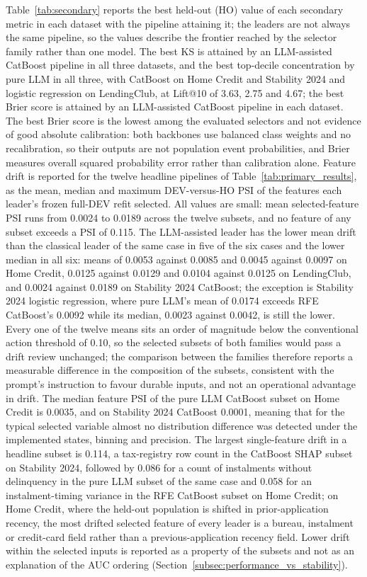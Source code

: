 \documentclass[final,5p,twocolumn]{elsarticle}
\begin{document}
Table~\ref{tab:secondary} reports the best held-out (HO) value of each secondary metric in each dataset with the pipeline attaining it; the leaders are not always the same pipeline, so the values describe the frontier reached by the selector family rather than one model. The best KS is attained by an LLM-assisted CatBoost pipeline in all three datasets, and the best top-decile concentration by pure LLM in all three, with CatBoost on Home Credit and Stability 2024 and logistic regression on LendingClub, at Lift@10 of 3.63, 2.75 and 4.67; the best Brier score is attained by an LLM-assisted CatBoost pipeline in each dataset. The best Brier score is the lowest among the evaluated selectors and not evidence of good absolute calibration: both backbones use balanced class weights and no recalibration, so their outputs are not population event probabilities, and Brier measures overall squared probability error rather than calibration alone. Feature drift is reported for the twelve headline pipelines of Table~\ref{tab:primary_results}, as the mean, median and maximum DEV-versus-HO PSI of the features each leader's frozen full-DEV refit selected. All values are small: mean selected-feature PSI runs from 0.0024 to 0.0189 across the twelve subsets, and no feature of any subset exceeds a PSI of 0.115. The LLM-assisted leader has the lower mean drift than the classical leader of the same case in five of the six cases and the lower median in all six: means of 0.0053 against 0.0085 and 0.0045 against 0.0097 on Home Credit, 0.0125 against 0.0129 and 0.0104 against 0.0125 on LendingClub, and 0.0024 against 0.0189 on Stability 2024 CatBoost; the exception is Stability 2024 logistic regression, where pure LLM's mean of 0.0174 exceeds RFE CatBoost's 0.0092 while its median, 0.0023 against 0.0042, is still the lower. Every one of the twelve means sits an order of magnitude below the conventional action threshold of 0.10, so the selected subsets of both families would pass a drift review unchanged; the comparison between the families therefore reports a measurable difference in the composition of the subsets, consistent with the prompt's instruction to favour durable inputs, and not an operational advantage in drift. The median feature PSI of the pure LLM CatBoost subset on Home Credit is 0.0035, and on Stability 2024 CatBoost 0.0001, meaning that for the typical selected variable almost no distribution difference was detected under the implemented states, binning and precision. The largest single-feature drift in a headline subset is 0.114, a tax-registry row count in the CatBoost SHAP subset on Stability 2024, followed by 0.086 for a count of instalments without delinquency in the pure LLM subset of the same case and 0.058 for an instalment-timing variance in the RFE CatBoost subset on Home Credit; on Home Credit, where the held-out population is shifted in prior-application recency, the most drifted selected feature of every leader is a bureau, instalment or credit-card field rather than a previous-application recency field. Lower drift within the selected inputs is reported as a property of the subsets and not as an explanation of the AUC ordering (Section~\ref{subsec:performance_vs_stability}).
\end{document}
